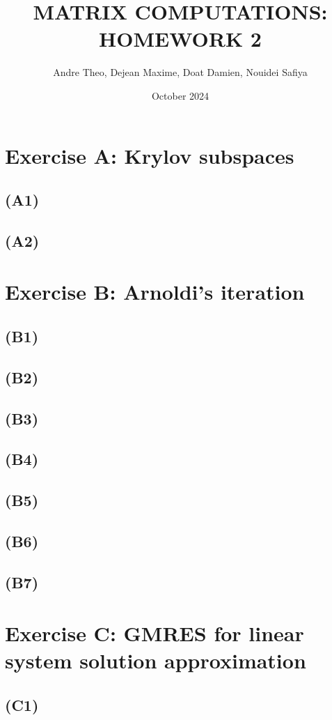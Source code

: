 \documentclass{article}
\title{\textbf{MATRIX COMPUTATIONS: HOMEWORK 2}}  %
\author{Andre Theo,
Dejean Maxime,
Doat Damien,
Nouidei Safiya}
\date{October 2024}
\begin{document}
\maketitle

\section{Exercise A: Krylov subspaces}
\subsection*{(A1)}
\subsection*{(A2)}

\section{Exercise B: Arnoldi’s iteration}
\subsection*{(B1)}
\subsection*{(B2)}
\subsection*{(B3)}
\subsection*{(B4)}
\subsection*{(B5)}
\subsection*{(B6)}
\subsection*{(B7)}

\newpage
\section{Exercise C: GMRES for linear system solution approximation}
\subsection*{(C1)}
\end{document}
